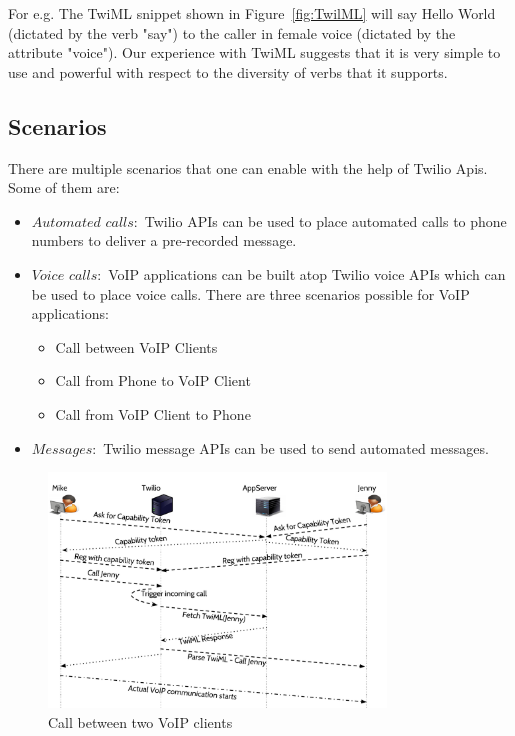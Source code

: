 For e.g. The TwiML snippet shown in Figure~\ref{fig:TwilML} will say Hello World (dictated by the verb "say") to the caller in female voice (dictated by the attribute "voice"). Our experience with TwiML suggests that it is very simple to use and powerful with respect to the diversity of verbs that it supports.



\subsection{Scenarios}

There are multiple scenarios that one can enable with the help of Twilio Apis. Some of them are:

\begin{itemize}
\item $Automated$ $calls: $ Twilio APIs can be used to place automated calls to phone numbers to deliver a pre-recorded message.
\item $Voice$ $calls: $ VoIP applications can be built atop Twilio voice APIs which can be used to place voice calls. There are three scenarios possible for VoIP applications:  
\begin{itemize}
\item Call between VoIP Clients
\item Call from Phone to VoIP Client
\item Call from VoIP Client to Phone
\end{itemize}
\item $Messages: $ Twilio message APIs can be used to send automated messages.
\end{itemize}


\begin{figure}[t!] 
\centering
  \includegraphics[width=0.8\textwidth]{figs/twoclients.pdf}
\caption{Call between two VoIP clients}
\label{fig:2VoIPcall}
\end{figure}
